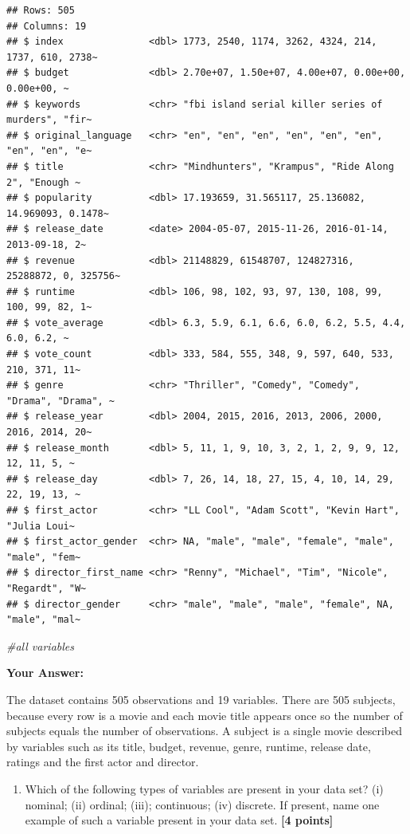\documentclass[
]{article}
\newenvironment{Shaded}{\begin{snugshade}}{\end{snugshade}}
\newcommand{\CommentTok}[1]{\textcolor[rgb]{0.56,0.35,0.01}{\textit{#1}}}
\providecommand{\tightlist}{%
  \setlength{\itemsep}{0pt}\setlength{\parskip}{0pt}}
\begin{document}
\begin{verbatim}
## Rows: 505
## Columns: 19
## $ index               <dbl> 1773, 2540, 1174, 3262, 4324, 214, 1737, 610, 2738~
## $ budget              <dbl> 2.70e+07, 1.50e+07, 4.00e+07, 0.00e+00, 0.00e+00, ~
## $ keywords            <chr> "fbi island serial killer series of murders", "fir~
## $ original_language   <chr> "en", "en", "en", "en", "en", "en", "en", "en", "e~
## $ title               <chr> "Mindhunters", "Krampus", "Ride Along 2", "Enough ~
## $ popularity          <dbl> 17.193659, 31.565117, 25.136082, 14.969093, 0.1478~
## $ release_date        <date> 2004-05-07, 2015-11-26, 2016-01-14, 2013-09-18, 2~
## $ revenue             <dbl> 21148829, 61548707, 124827316, 25288872, 0, 325756~
## $ runtime             <dbl> 106, 98, 102, 93, 97, 130, 108, 99, 100, 99, 82, 1~
## $ vote_average        <dbl> 6.3, 5.9, 6.1, 6.6, 6.0, 6.2, 5.5, 4.4, 6.0, 6.2, ~
## $ vote_count          <dbl> 333, 584, 555, 348, 9, 597, 640, 533, 210, 371, 11~
## $ genre               <chr> "Thriller", "Comedy", "Comedy", "Drama", "Drama", ~
## $ release_year        <dbl> 2004, 2015, 2016, 2013, 2006, 2000, 2016, 2014, 20~
## $ release_month       <dbl> 5, 11, 1, 9, 10, 3, 2, 1, 2, 9, 9, 12, 12, 11, 5, ~
## $ release_day         <dbl> 7, 26, 14, 18, 27, 15, 4, 10, 14, 29, 22, 19, 13, ~
## $ first_actor         <chr> "LL Cool", "Adam Scott", "Kevin Hart", "Julia Loui~
## $ first_actor_gender  <chr> NA, "male", "male", "female", "male", "male", "fem~
## $ director_first_name <chr> "Renny", "Michael", "Tim", "Nicole", "Regardt", "W~
## $ director_gender     <chr> "male", "male", "male", "female", NA, "male", "mal~
\end{verbatim}

\begin{Shaded}
\begin{Highlighting}[]
\CommentTok{\#all variables}
\end{Highlighting}
\end{Shaded}

\textbf{Your Answer:}

The dataset contains 505 observations and 19 variables. There are 505
subjects, because every row is a movie and each movie title appears once
so the number of subjects equals the number of observations. A subject
is a single movie described by variables such as its title, budget,
revenue, genre, runtime, release date, ratings and the first actor and
director.

\begin{enumerate}
\def\labelenumi{\arabic{enumi}.}
\setcounter{enumi}{1}
\tightlist
\item
  Which of the following types of variables are present in your data
  set? (i) nominal; (ii) ordinal; (iii); continuous; (iv) discrete. If
  present, name one example of such a variable present in your data set.
  \textbf{[4 points]}
\end{enumerate}
\end{document}
